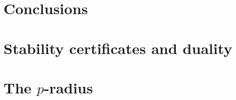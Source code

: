 \documentclass[review]{siamart1116}
\begin{document}




\section{Conclusions}





\appendix
\section{Stability certificates and duality}



\section{The $p$-radius}
\label{app:pradius}

\end{document}
